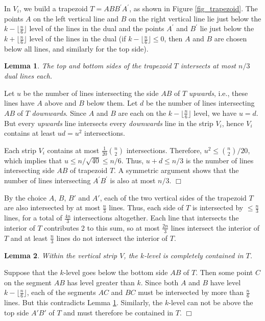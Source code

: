 \documentclass{elsart}
\newtheorem{lemma}{Lemma}
\newenvironment{proof}{{\bf Proof:} \rm}{\hfill $\Box$ \medskip\\}
\begin{document}
In $V_i$, we build a trapezoid $T = ABB^{\prime}A^{\prime}$, as shown
in Figure \ref{fig_trapezoid}. The points $A$ on the left vertical
line and $B$ on the right vertical line lie just below the $k -
\lfloor\frac{n}{6}\rfloor$ level of the lines in the dual and the
points $A^{\prime}$ and $B^{\prime}$ lie just below the $k +
\lfloor\frac{n}{6}\rfloor$ level of the lines in the dual (if $k -
\lfloor\frac{n}{6}\rfloor \le 0$, then $A$ and $B$ are chosen below
all lines, and similarly for the top side).

\begin{lemma}\label{lemma_trapezoid}
The top and bottom sides of the trapezoid $T$ intersects at most 
$n/3$ dual lines each.
\end{lemma}

\begin{proof}
Let $u$ be the number of lines intersecting the side $AB$ of $T$
\emph{upwards}, i.e., these lines have $A$ above and $B$ below them.
Let $d$ be the number of lines intersecting $AB$ of $T$
\emph{downwards}. Since $A$ and $B$ are each on the
$k-\lfloor\frac{n}{6}\rfloor$ level, we have $u = d$. But every
\emph{upwards} line intersects every \emph{downwards} line in the
strip $V_i$, hence $V_i$ contains at least $ud=u^2$ intersections.

Each
strip $V_i$ contains at most
$\frac{1}{20}{n\choose 2}$ intersections. Therefore, 
            $u^2 \le {n \choose 2}/20$, which implies that
$u \le n/\sqrt{40} \le n/6$.
Thus, $u+d\le n/3$ is the number of lines intersecting side $AB$ of
trapezoid $T$. A symmetric argument shows that the number of lines
intersecting 
$A^{\prime}B^{\prime}$ is also at most $n/3$.
\end{proof}

By the choice $A$, $B$, $B'$ and $A'$, each of the two vertical sides
of the trapezoid $T$ are also intersected by at most $\frac{n}{3}$
lines.  Thus, each side of $T$ is intersected by $\le \frac{n}{3}$
lines, for a total of $\frac{4n}{3}$ intersections altogether. Each
line that intersects the interior of $T$ contributes 2 to this sum, so
at most $\frac{2n}{3}$ lines intersect the interior of $T$ and at
least $\frac{n}{3}$ lines do not intersect the interior of $T$.


\begin{lemma}\label{lemma_trapezoid_containment}
Within the vertical strip $V$, the $k$-level is completely contained
in $T$. 
\end{lemma}

\begin{proof}
Suppose that the $k$-level goes below the bottom side $AB$ of $T$. Then
some point $C$ on the segment $AB$ has level greater than $k$. Since both
$A$ and $B$ have level $k - \lfloor\frac{n}{6}\rfloor$, each of the
segments $AC$ and $BC$ must be intersected by more than
$\frac{n}{6}$ lines. But this contradicts Lemma \ref{lemma_trapezoid}.
Similarly, the $k$-level can not be above the top side $A'B'$ of $T$
and must therefore be contained in $T$.
\end{proof}
\end{document}
